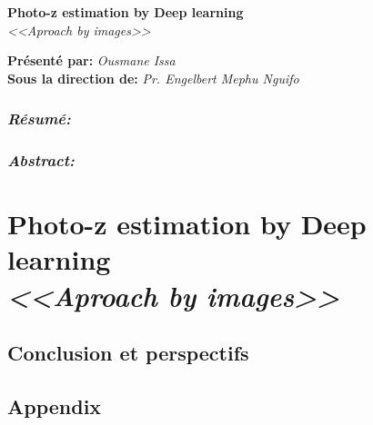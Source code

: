 \documentclass[french]{report}
\begin{document}
\begin{titlepage}
    \begin{center}
        \LARGE \textbf{Photo-z estimation by Deep learning}\\
        \large \textit{<<Aproach by images>>}
    \end{center}
    
    \begin{center}
        \Large \textbf{Présenté par:} \textit{Ousmane Issa}\\
        \Large \textbf{Sous la direction de:} \textit{  Pr. Engelbert Mephu Nguifo}
    \end{center}
\end{titlepage}

\tableofcontents


\section*{\textit{Résumé:}}

\section*{\textit{Abstract:}}




\part{Photo-z estimation by Deep learning \\
        \large \textit{<<Aproach by images>>}}






%
%
%
%
%



\chapter*{Conclusion et perspectifs}

\chapter*{Appendix}



\printbibliography
\end{document}
